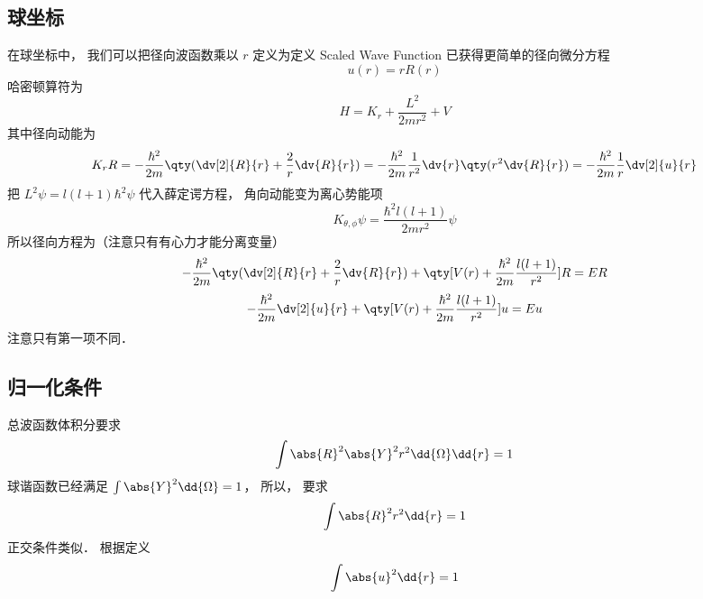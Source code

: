 
\subsection{球坐标}

在球坐标中， 我们可以把径向波函数乘以 $r$  定义为定义 Scaled Wave Function 已获得更简单的径向微分方程
\begin{equation}
u(r) = rR(r)
\end{equation}
哈密顿算符为
\begin{equation}
H = K_r + \frac{L^2}{2mr^2} + V
\end{equation}
其中径向动能为
\begin{equation}
K_r R =  - \frac{\hbar^2}{2m} \qty(\dv[2]{R}{r} + \frac2r \dv{R}{r}) = -\frac{\hbar^2}{2m}\frac{1}{r^2} \dv{r} \qty(r^2\dv{R}{r}) =  - \frac{\hbar^2}{2m}\frac1r \dv[2]{u}{r}
\end{equation}
把 $L^2 \psi  = l(l + 1)\hbar^2 \psi$  代入薛定谔方程， 角向动能变为离心势能项
\begin{equation}
K_{\theta, \phi} \psi  = \frac{\hbar^2 l(l + 1)}{2m r^2}\psi
\end{equation}
所以径向方程为（注意只有有心力才能分离变量）
\begin{equation}
-\frac{\hbar^2}{2m} \qty(\dv[2]{R}{r} + \frac2r \dv{R}{r}) + \qty[V(r) + \frac{\hbar^2}{2m}\frac{l(l + 1)}{r^2}]R = ER
\end{equation}
\begin{equation}
-\frac{\hbar^2}{2m} \dv[2]{u}{r} + \qty[V(r) + \frac{\hbar^2}{2m}\frac{l(l + 1)}{r^2}]u = Eu
\end{equation}
注意只有第一项不同．

\subsection{归一化条件}

总波函数体积分要求
\begin{equation}
\int \abs{R}^2 \abs{Y}^2 r^2 \dd{\Omega}\dd{r}  = 1
\end{equation}
球谐函数已经满足 $\int \abs{Y}^2 \dd{\Omega} = 1$，  所以， 要求
\begin{equation}
\int \abs{R}^2 r^2 \dd{r}  = 1
\end{equation}
正交条件类似． 根据定义
\begin{equation}
\int \abs{u}^2 \dd{r}  = 1
\end{equation}

